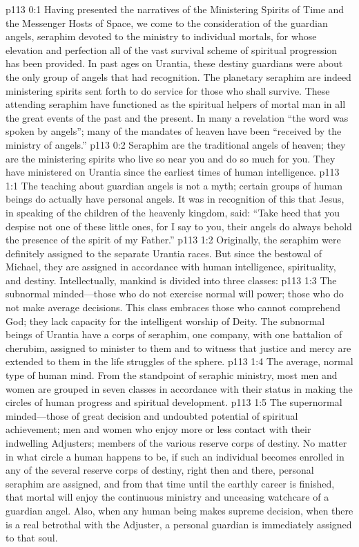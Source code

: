 \author{Chief of Seraphim}
\vs p113 0:1 Having presented the narratives of the Ministering Spirits of Time and the Messenger Hosts of Space, we come to the consideration of the guardian angels, seraphim devoted to the ministry to individual mortals, for whose elevation and perfection all of the vast survival scheme of spiritual progression has been provided. In past ages on Urantia, these destiny guardians were about the only group of angels that had recognition. The planetary seraphim are indeed ministering spirits sent forth to do service for those who shall survive. These attending seraphim have functioned as the spiritual helpers of mortal man in all the great events of the past and the present. In many a revelation “the word was spoken by angels”; many of the mandates of heaven have been “received by the ministry of angels.”
\vs p113 0:2 Seraphim are the traditional angels of heaven; they are the ministering spirits who live so near you and do so much for you. They have ministered on Urantia since the earliest times of human intelligence.
\vs p113 1:1 The teaching about guardian angels is not a myth; certain groups of human beings do actually have personal angels. It was in recognition of this that Jesus, in speaking of the children of the heavenly kingdom, said: \textcolor{ubdarkred}{“Take heed that you despise not one of these little ones, for I say to you, their angels do always behold the presence of the spirit of my Father.”}
\vs p113 1:2 Originally, the seraphim were definitely assigned to the separate Urantia races. But since the bestowal of Michael, they are assigned in accordance with human intelligence, spirituality, and destiny. Intellectually, mankind is divided into three classes:
\pc \vs p113 1:3 \bibnobreakspace The subnormal minded---those who do not exercise normal will power; those who do not make average decisions. This class embraces those who cannot comprehend God; they lack capacity for the intelligent worship of Deity. The subnormal beings of Urantia have a corps of seraphim, one company, with one battalion of cherubim, assigned to minister to them and to witness that justice and mercy are extended to them in the life struggles of the sphere.\plusone
\pc \vs p113 1:4 \bibnobreakspace The average, normal type of human mind. From the standpoint of seraphic ministry, most men and women are grouped in seven classes in accordance with their status in making the circles of human progress and spiritual development.
\pc \vs p113 1:5 \bibnobreakspace The supernormal minded---those of great decision and undoubted potential of spiritual achievement; men and women who enjoy more or less contact with their indwelling Adjusters; members of the various reserve corps of destiny. No matter in what circle a human happens to be, if such an individual becomes enrolled in any of the several reserve corps of destiny, right then and there, personal seraphim are assigned, and from that time until the earthly career is finished, that mortal will enjoy the continuous ministry and unceasing watchcare of a guardian angel. Also, when any human being makes  supreme decision, when there is a real betrothal with the Adjuster, a personal guardian is immediately assigned to that soul.\plusone
